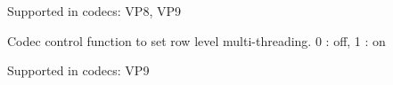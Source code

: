 \begin{Desc}
\begin{description}
Supported in codecs\+: V\+P8, V\+P9 \item[{\em 
V\+P9\+D\+\_\+\+S\+E\+T\+\_\+\+R\+O\+W\+\_\+\+MT\hypertarget{group__vp8__decoder_ggaf9dd3f2e6d1412106ee791af768e57c1a387b0251963942c5589c830a77dfa46b}{}\label{group__vp8__decoder_ggaf9dd3f2e6d1412106ee791af768e57c1a387b0251963942c5589c830a77dfa46b}
}]Codec control function to set row level multi-\/threading. 0 \+: off, 1 \+: on

Supported in codecs\+: V\+P9 \end{description}
\end{Desc}
